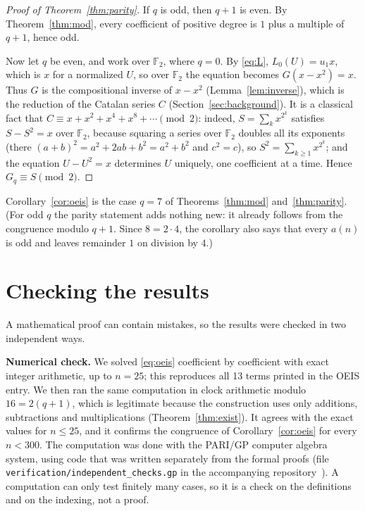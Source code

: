 \documentclass[11pt,a4paper]{article}
\theoremstyle{definition}
\theoremstyle{remark}
\newcommand{\F}{\mathbb{F}}
\newcommand{\para}[1]{\par\medskip\noindent\textbf{#1}\enspace}
\begin{document}
\begin{proof}[Proof of Theorem~\ref{thm:parity}]
If $q$ is odd, then $q+1$ is even. By Theorem~\ref{thm:mod}, every coefficient of positive degree is $1$ plus a multiple
of $q+1$, hence odd.

Now let $q$ be even, and work over $\F_2$, where $q=0$. By \eqref{eq:L}, $L_0(U)=u_1x$, which is $x$ for a normalized
$U$, so over $\F_2$ the equation becomes $G(x-x^2)=x$. Thus $G$ is the compositional inverse of $x-x^2$
(Lemma~\ref{lem:inverse}), which is the reduction of the Catalan series $C$ (Section~\ref{sec:background}). It is a
classical fact that $C\equiv x+x^2+x^4+x^8+\cdots\pmod 2$: indeed, $S=\sum_kx^{2^k}$ satisfies $S-S^2=x$ over $\F_2$,
because squaring a series over $\F_2$ doubles all its exponents (there $(a+b)^2=a^2+2ab+b^2=a^2+b^2$ and $c^2=c$), so $S^2=\sum_{k\ge1}x^{2^k}$; and the equation
$U-U^2=x$ determines $U$ uniquely, one coefficient at a time. Hence $G_q\equiv S\pmod2$.
\end{proof}


Corollary~\ref{cor:oeis} is the case $q=7$ of Theorems~\ref{thm:mod} and~\ref{thm:parity}.
(For odd $q$ the parity statement adds nothing new: it already follows from the congruence modulo $q+1$. Since $8=2\cdot4$, the corollary also says that every $a(n)$ is odd and leaves remainder $1$ on division by $4$.)

\section{Checking the results}\label{sec:checks}

A mathematical proof can contain mistakes, so the results were checked in two independent ways.

\para{Numerical check.}
We solved \eqref{eq:oeis} coefficient by coefficient with exact integer arithmetic, up to $n=25$; this
reproduces all 13 terms printed in the OEIS entry. We then ran the same computation in clock
arithmetic modulo $16=2(q+1)$, which is legitimate because the construction uses only additions,
subtractions and multiplications (Theorem~\ref{thm:exist}). It agrees with the exact values for $n\le25$, and it confirms
the congruence of Corollary~\ref{cor:oeis} for every $n<300$.
The computation was done with the PARI/GP computer algebra system, using code that was written separately from the
formal proofs (file \texttt{verification/independent\_checks.gp} in the accompanying repository~\cite{repo}).
A computation can only test finitely many cases, so it is a check on the definitions and on the indexing, not a proof.
\end{document}
